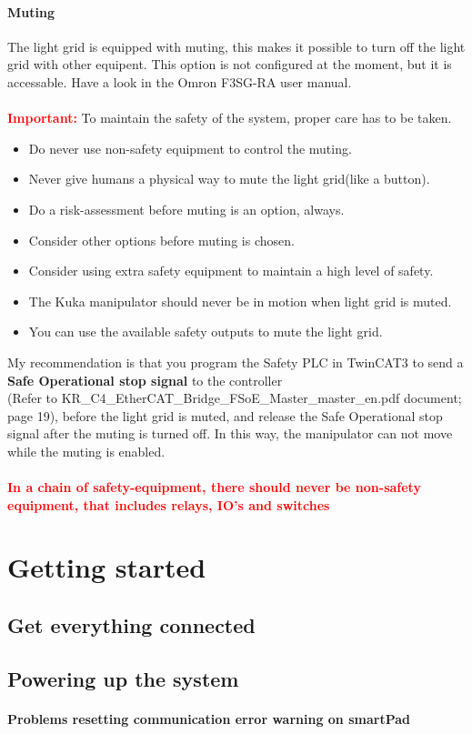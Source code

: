 \documentclass{article}
\begin{document}
        \paragraph{Muting}
        The light grid is equipped with muting, this makes it possible to turn off the light grid with other equipent. This option is not configured at the moment, but it is accessable. Have a look in the Omron F3SG-RA user manual. 
        \\\\
        \textbf{\textcolor{red}{Important:}} To maintain the safety of the system, proper care has to be taken. 
        \begin{itemize}
            \item  Do never use non-safety equipment to control the muting.
            \item Never give humans a physical way to mute the light grid(like a button).
            \item Do a risk-assessment before muting is an option, always. 
            \item Consider other options before muting is chosen.
            \item Consider using extra safety equipment to maintain a high level of safety.
            \item The Kuka manipulator should never be in motion when light grid is muted.
            \item You can use the available safety outputs to mute the light grid.
        \end{itemize}

        My recommendation is that you program the Safety PLC in TwinCAT3 to send a \textbf{Safe Operational stop signal} to the controller
        \\
        (Refer to KR\_C4\_EtherCAT\_Bridge\_FSoE\_Master\_master\_en.pdf document; page 19), before the light grid is muted, and release the Safe Operational stop signal after the muting is turned off. In this way, the manipulator can not move while the muting is enabled. 
        \\\\
        \textbf{\textcolor{red}{In a chain of safety-equipment, there should never be non-safety equipment, that includes relays, IO's and switches}}
        
\section{Getting started}
    \subsection{Get everything connected}
    \subsection{Powering up the system}
    \paragraph{Problems resetting communication error warning on smartPad}
    
\end{document}
